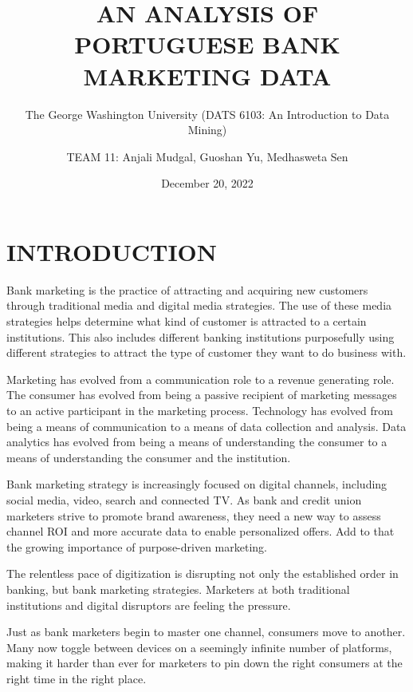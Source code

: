 \documentclass[
  letterpaper,
  DIV=11,
  numbers=noendperiod]{scrartcl}
\title{AN ANALYSIS OF PORTUGUESE BANK MARKETING DATA}
\subtitle{The George Washington University (DATS 6103: An Introduction
to Data Mining)}
\author{TEAM 11: Anjali Mudgal, Guoshan Yu, Medhasweta Sen}
\date{December 20, 2022}
\begin{document}
\maketitle
\ifdefined\Shaded\renewenvironment{Shaded}{\begin{tcolorbox}[breakable, frame hidden, enhanced, boxrule=0pt, borderline west={3pt}{0pt}{shadecolor}, sharp corners, interior hidden]}{\end{tcolorbox}}\fi

\hypertarget{introduction}{%
\section{INTRODUCTION}\label{introduction}}

Bank marketing is the practice of attracting and acquiring new customers
through traditional media and digital media strategies. The use of these
media strategies helps determine what kind of customer is attracted to a
certain institutions. This also includes different banking institutions
purposefully using different strategies to attract the type of customer
they want to do business with.

Marketing has evolved from a communication role to a revenue generating
role. The consumer has evolved from being a passive recipient of
marketing messages to an active participant in the marketing process.
Technology has evolved from being a means of communication to a means of
data collection and analysis. Data analytics has evolved from being a
means of understanding the consumer to a means of understanding the
consumer and the institution.

Bank marketing strategy is increasingly focused on digital channels,
including social media, video, search and connected TV. As bank and
credit union marketers strive to promote brand awareness, they need a
new way to assess channel ROI and more accurate data to enable
personalized offers. Add to that the growing importance of
purpose-driven marketing.

The relentless pace of digitization is disrupting not only the
established order in banking, but bank marketing strategies. Marketers
at both traditional institutions and digital disruptors are feeling the
pressure.

Just as bank marketers begin to master one channel, consumers move to
another. Many now toggle between devices on a seemingly infinite number
of platforms, making it harder than ever for marketers to pin down the
right consumers at the right time in the right place.
\end{document}
